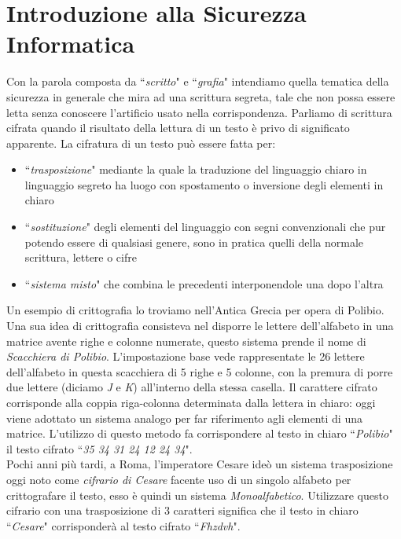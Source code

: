 \documentclass[a4paper,12pt]{tesiinfo}
\begin{document}
\maketitle %
\contentspage %



\chapter{Introduzione alla Sicurezza Informatica}
Con la parola composta da ``\textit{scritto}" e ``\textit{grafia}" intendiamo quella tematica della sicurezza in generale che mira ad una scrittura segreta, tale che non possa essere letta senza conoscere l'artificio usato nella corrispondenza. Parliamo di scrittura cifrata quando il risultato della lettura di un testo \`e privo di significato apparente. La cifratura di un testo pu\`o essere fatta per:
\begin{itemize}
 \item ``\textit{trasposizione}" mediante la quale la traduzione del linguaggio chiaro in linguaggio segreto ha luogo con spostamento o inversione degli elementi in chiaro
 \item ``\textit{sostituzione}" degli elementi del linguaggio con segni convenzionali che pur potendo essere di qualsiasi genere, sono in pratica quelli della normale scrittura, lettere o cifre
 \item ``\textit{sistema misto}" che combina le precedenti interponendole una dopo l'altra
\end{itemize} 
Un esempio di crittografia lo troviamo nell'Antica Grecia per opera di Polibio. Una sua idea di crittografia consisteva nel disporre le lettere dell'alfabeto in una matrice avente righe e colonne numerate, questo sistema prende il nome di \textit{Scacchiera di Polibio}. L'impostazione base vede rappresentate le 26 lettere dell'alfabeto in questa scacchiera di 5 righe e 5 colonne, con la premura di porre due lettere (diciamo \textit{J} e \textit{K}) all'interno della stessa casella. Il carattere cifrato corrisponde alla coppia riga-colonna determinata dalla lettera in chiaro: oggi viene adottato un sistema analogo per far riferimento agli elementi di una matrice. L'utilizzo di questo metodo fa corrispondere al testo in chiaro ``\textit{Polibio}" il testo cifrato ``\emph{35 34 31 24 12 24 34}". 
\\
Pochi anni pi\`u tardi, a Roma, l'imperatore Cesare ide\`o un sistema trasposizione oggi noto come \textit{cifrario di Cesare} facente uso di un singolo alfabeto per crittografare il testo, esso \`e quindi un sistema \textit{Monoalfabetico}. Utilizzare questo cifrario con una trasposizione di 3 caratteri significa che il testo in chiaro ``\textit{Cesare}" corrisponder\`a al testo cifrato ``\textit{Fhzdvh}".
\end{document}
